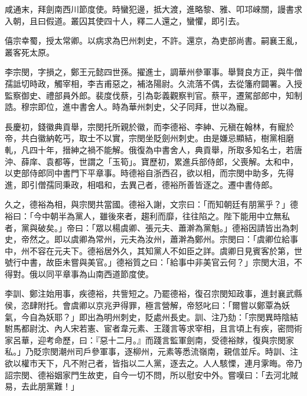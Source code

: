 \begin{pinyinscope}
 咸通末，拜劍南西川節度使。時蠻犯邊，抵大渡，進略黎、雅、叩邛崍關，謾書求入朝，且曰假道。叢囚其使四十人，釋二人還之，蠻懼，即引去。



 僖宗幸蜀，授太常卿。以病求為巴州刺史，不許。還京，為吏部尚書。嗣襄王亂，叢客死太原。



 李宗閔，字損之，鄭王元懿四世孫。擢進士，調華州參軍事。舉賢良方正，與牛僧孺詆切時政，觸宰相，李吉甫惡之，補洛陽尉。久流落不偶，去從籓府闢署。入授監察御史、禮部員外郎。裴度伐蔡，引為彰義觀察判官。蔡平，遷駕部郎中，知制誥。穆宗即位，進中書舍人。時為華州刺史，父子同拜，世以為寵。



 長慶初，錢徽典貢舉，宗閔托所親於徽，而李德裕、李紳、元稹在翰林，有寵於帝，共白徽納乾丐，取士不以實，宗閔坐貶劍州刺史。由是嫌忌顯結，樹黨相磨軋，凡四十年，搢紳之禍不能解。俄復為中書舍人，典貢舉，所取多知名士，若唐沖、薛庠、袁都等，世謂之「玉筍」。寶歷初，累進兵部侍郎，父喪解。太和中，以吏部侍郎同中書門下平章事。時德裕自浙西召，欲以相，而宗閔中助多，先得進，即引僧孺同秉政，相唱和，去異己者，德裕所善皆逐之。遷中書侍郎。



 久之，德裕為相，與宗閔共當國。德裕入謝，文宗曰：「而知朝廷有朋黨乎？」德裕曰：「今中朝半為黨人，雖後來者，趨利而靡，往往陷之。陛下能用中立無私者，黨與破矣。」帝曰：「眾以楊虞卿、張元夫、蕭澣為黨魁。」德裕因請皆出為刺史，帝然之。即以虞卿為常州，元夫為汝州，蕭澣為鄭州。宗閔曰：「虞卿位給事中，州不容在元夫下。德裕居外久，其知黨人不如臣之詳。虞卿日見賓客於第，世號行中書，故臣未嘗與美官。」德裕質之曰：「給事中非美官云何？」宗閔大沮，不得對。俄以同平章事為山南西道節度使。



 李訓、鄭注始用事，疾德裕，共訾短之。乃罷德裕，復召宗閔知政事，進封襄武縣侯，恣肆附托。會虞卿以京兆尹得罪，極言營解，帝怒叱曰：「爾嘗以鄭覃為妖氣，今自為妖耶？」即出為明州刺史，貶處州長史。訓、注乃劾：「宗閔異時陰結駙馬都尉沈、內人宋若憲、宦者韋元素、王踐言等求宰相，且言頃上有疾，密問術家呂華，迎考命歷，曰：『惡十二月。』而踐言監軍劍南，受德裕賕，復與宗閔家私。」乃貶宗閔潮州司戶參軍事，逐柳州，元素等悉流嶺南，親信並斥。時訓、注欲以權市天下，凡不附己者，皆指以二人黨，逐去之。人人駭慄，連月雺晦。帝乃詔宗閔、德裕姻家門生故吏，自今一切不問，所以慰安中外。嘗嘆曰：「去河北賊易，去此朋黨難！」




\end{pinyinscope}
